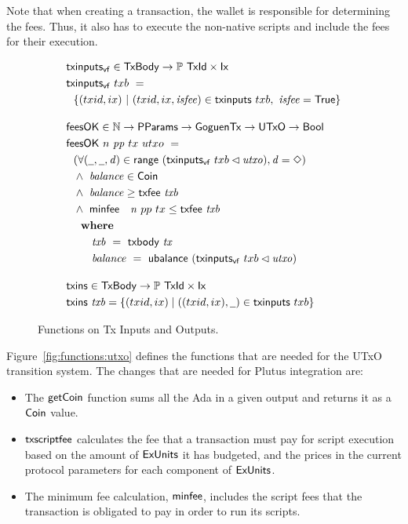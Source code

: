 Note that when creating a transaction, the wallet is responsible for
determining the fees. Thus, it also has to execute the non-native scripts
and include the fees for their execution.
\begin{figure}[htb]
  \begin{align*}
    & \fun{txinputs_{vf}} \in \TxBody \to \powerset{\TxId \times \Ix} \\
    & \fun{txinputs_{vf}} ~txb~= \\
    &~~\{ (txid,ix)~\vert~(txid,ix,\var{isfee}) \in
    \fun{txinputs} ~txb,~
     \var{isfee} = \True\}
    \nextdef
    & \fun{feesOK} \in \N \to \PParams \to \GoguenTx \to \UTxO \to \Bool  \\
    & \fun{feesOK} ~n~\var{pp}~tx~utxo~= \\
    &~~(\forall (\wcard, \wcard, \var{d}) \in \fun{range}~(\fun{txinputs_{vf}}~{txb} \restrictdom \var{utxo}), \var{d} = \Nothing) \\
    &~~\wedge~ \var{balance} \in \Coin \\
    &~~      \wedge~ \var{balance} \geq \txfee{txb} ~ \\
    &~~      \wedge~ \minfee~n~{pp}~{tx} \leq \txfee{txb} \\
    &~~      \where \\
    & ~~~~~~~ \var{txb}~=~\txbody{tx} \\
    & ~~~~~~~ \var{balance}~=~\fun{ubalance}~(\fun{txinputs_{vf}}~{txb} \restrictdom \var{utxo})
    \nextdef
    & \fun{txins} \in \TxBody \to \powerset{\TxId \times \Ix} \\
    & \fun{txins} ~\var{txb} = \{(txid,ix) \mid ((txid,ix),\wcard)\in\fun{txinputs} ~txb\}
  \end{align*}
  \caption{Functions on Tx Inputs and Outputs.}
  \label{fig:functions:insouts}
\end{figure}
%
Figure~\ref{fig:functions:utxo} defines the functions that are needed for the UTxO transition system.
The changes that are needed for Plutus integration are:

\begin{itemize}

  \item The $\mathsf{getCoin}$ function sums all the Ada in a given output and returns it as a
  $\mathsf{Coin}$ value.

  \item $\mathsf{txscriptfee}$ calculates the fee that a transaction must pay for script
  execution based on the amount of $\mathsf{ExUnits}$ it has budgeted, and the prices in the current protocol parameters
  for each component of $\mathsf{ExUnits}$.

  \item The minimum fee calculation, $\mathsf{minfee}$, includes the script
  fees that the transaction is obligated to pay in order to run its scripts.
\end{itemize}

